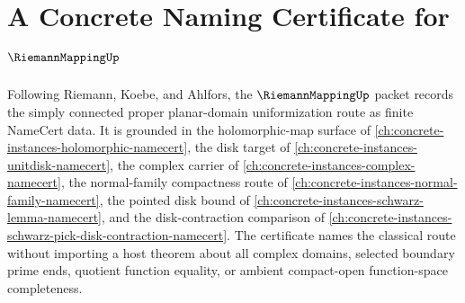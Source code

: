 \chapter{A Concrete Naming Certificate for $\RiemannMappingUp$}
\label{ch:concrete-instances-riemann-mapping-namecert}

Following Riemann, Koebe, and Ahlfors, the $\RiemannMappingUp$ packet records the simply connected proper planar-domain uniformization route as finite NameCert data. It is grounded in the holomorphic-map surface of \autoref{ch:concrete-instances-holomorphic-namecert}, the disk target of \autoref{ch:concrete-instances-unitdisk-namecert}, the complex carrier of \autoref{ch:concrete-instances-complex-namecert}, the normal-family compactness route of \autoref{ch:concrete-instances-normal-family-namecert}, the pointed disk bound of \autoref{ch:concrete-instances-schwarz-lemma-namecert}, and the disk-contraction comparison of \autoref{ch:concrete-instances-schwarz-pick-disk-contraction-namecert}. The certificate names the classical route without importing a host theorem about all complex domains, selected boundary prime ends, quotient function equality, or ambient compact-open function-space completeness.

